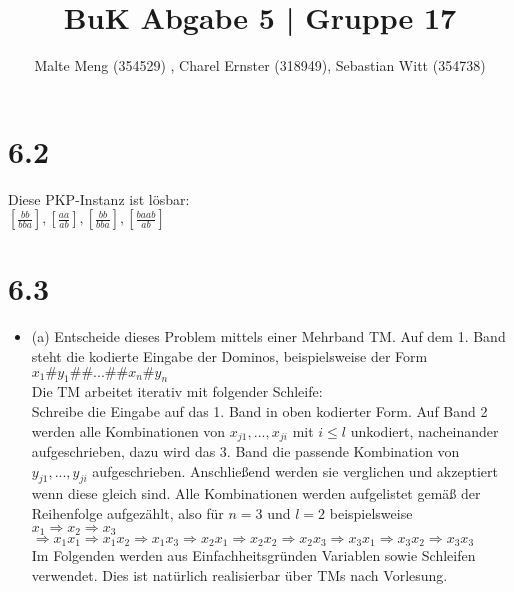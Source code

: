 \documentclass{article}
\title{BuK Abgabe 5 | Gruppe 17}
\author{Malte Meng (354529) , Charel Ernster (318949), Sebastian Witt (354738)}
\begin{document}
	\maketitle
\section{6.2} 
Diese PKP-Instanz ist lösbar:\\

$[\frac{bb}{bba}],[\frac{aa}{ab}],[\frac{bb}{bba}],[\frac{baab}{ab}]$\\

\section{6.3}
\begin{itemize}
	\item (a) Entscheide dieses Problem mittels einer Mehrband TM. Auf dem 1. Band steht die kodierte Eingabe der Dominos, beispielsweise der Form\\
	
	$x_1 \# y_1 \# \#...\# \# x_n \# y_n$\\
	
	Die TM arbeitet iterativ mit folgender Schleife:\\
	
	Schreibe die Eingabe auf das 1. Band in oben kodierter Form. Auf Band 2 werden alle Kombinationen von $x_{j1},...,x_{ji}$ mit $i \leq l$ unkodiert, nacheinander aufgeschrieben, dazu wird das 3. Band die passende Kombination von $y_{j1},...,y_{ji}$ aufgeschrieben. Anschließend werden sie verglichen und akzeptiert wenn diese gleich sind. Alle Kombinationen werden aufgelistet gemäß der Reihenfolge aufgezählt, also für $n=3$ und $l=2$ beispielsweise\\
	
	$x_1 \Rightarrow x_2 \Rightarrow x_3$\\
	
	$\Rightarrow x_1 x_1 \Rightarrow x_1 x_2 \Rightarrow x_1 x_3 \Rightarrow x_2 x_1 \Rightarrow x_2 x_2 \Rightarrow x_2 x_3 \Rightarrow x_3 x_1	\Rightarrow x_3 x_2 \Rightarrow x_3 x_3$\\
	
	Im Folgenden werden aus Einfachheitsgründen Variablen sowie Schleifen verwendet. Dies ist natürlich realisierbar über TMs nach Vorlesung.\\
	

\end{itemize}
\end{document}
